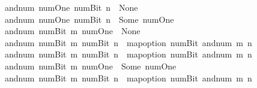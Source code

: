 \begin{isabellebody}
{\isacharbar}{\kern0pt}\ {\isacartoucheopen}and{\isacharunderscore}{\kern0pt}num\ num{\isachardot}{\kern0pt}One\ {\isacharparenleft}{\kern0pt}num{\isachardot}{\kern0pt}Bit{}\ n{\isacharparenright}{\kern0pt}\ {\isacharequal}{\kern0pt}\ None{\isacartoucheclose}\isanewline
{\isacharbar}{\kern0pt}\ {\isacartoucheopen}and{\isacharunderscore}{\kern0pt}num\ num{\isachardot}{\kern0pt}One\ {\isacharparenleft}{\kern0pt}num{\isachardot}{\kern0pt}Bit{}\ n{\isacharparenright}{\kern0pt}\ {\isacharequal}{\kern0pt}\ Some\ num{\isachardot}{\kern0pt}One{\isacartoucheclose}\isanewline
{\isacharbar}{\kern0pt}\ {\isacartoucheopen}and{\isacharunderscore}{\kern0pt}num\ {\isacharparenleft}{\kern0pt}num{\isachardot}{\kern0pt}Bit{}\ m{\isacharparenright}{\kern0pt}\ num{\isachardot}{\kern0pt}One\ {\isacharequal}{\kern0pt}\ None{\isacartoucheclose}\isanewline
{\isacharbar}{\kern0pt}\ {\isacartoucheopen}and{\isacharunderscore}{\kern0pt}num\ {\isacharparenleft}{\kern0pt}num{\isachardot}{\kern0pt}Bit{}\ m{\isacharparenright}{\kern0pt}\ {\isacharparenleft}{\kern0pt}num{\isachardot}{\kern0pt}Bit{}\ n{\isacharparenright}{\kern0pt}\ {\isacharequal}{\kern0pt}\ map{\isacharunderscore}{\kern0pt}option\ num{\isachardot}{\kern0pt}Bit{}\ {\isacharparenleft}{\kern0pt}and{\isacharunderscore}{\kern0pt}num\ m\ n{\isacharparenright}{\kern0pt}{\isacartoucheclose}\isanewline
{\isacharbar}{\kern0pt}\ {\isacartoucheopen}and{\isacharunderscore}{\kern0pt}num\ {\isacharparenleft}{\kern0pt}num{\isachardot}{\kern0pt}Bit{}\ m{\isacharparenright}{\kern0pt}\ {\isacharparenleft}{\kern0pt}num{\isachardot}{\kern0pt}Bit{}\ n{\isacharparenright}{\kern0pt}\ {\isacharequal}{\kern0pt}\ map{\isacharunderscore}{\kern0pt}option\ num{\isachardot}{\kern0pt}Bit{}\ {\isacharparenleft}{\kern0pt}and{\isacharunderscore}{\kern0pt}num\ m\ n{\isacharparenright}{\kern0pt}{\isacartoucheclose}\isanewline
{\isacharbar}{\kern0pt}\ {\isacartoucheopen}and{\isacharunderscore}{\kern0pt}num\ {\isacharparenleft}{\kern0pt}num{\isachardot}{\kern0pt}Bit{}\ m{\isacharparenright}{\kern0pt}\ num{\isachardot}{\kern0pt}One\ {\isacharequal}{\kern0pt}\ Some\ num{\isachardot}{\kern0pt}One{\isacartoucheclose}\isanewline
{\isacharbar}{\kern0pt}\ {\isacartoucheopen}and{\isacharunderscore}{\kern0pt}num\ {\isacharparenleft}{\kern0pt}num{\isachardot}{\kern0pt}Bit{}\ m{\isacharparenright}{\kern0pt}\ {\isacharparenleft}{\kern0pt}num{\isachardot}{\kern0pt}Bit{}\ n{\isacharparenright}{\kern0pt}\ {\isacharequal}{\kern0pt}\ map{\isacharunderscore}{\kern0pt}option\ num{\isachardot}{\kern0pt}Bit{}\ {\isacharparenleft}{\kern0pt}and{\isacharunderscore}{\kern0pt}num\ m\ n{\isacharparenright}{\kern0pt}{\isacartoucheclose}\isanewline

\end{isabellebody}

